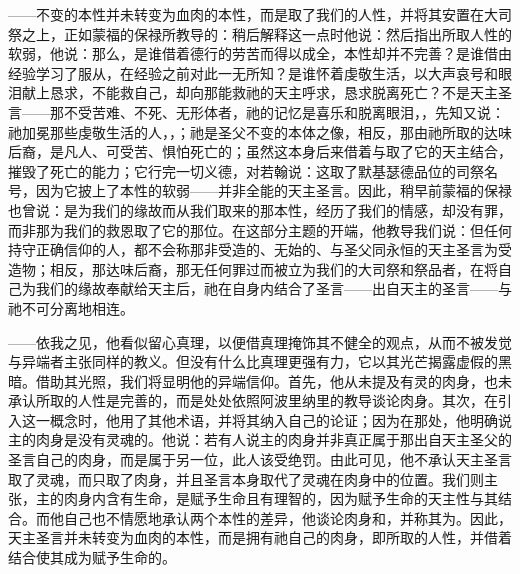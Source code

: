 ——不变的本性并未转变为血肉的本性，而是取了我们的人性，并将其安置在大司祭之上，正如蒙福的保禄所教导的：稍后解释这一点时他说：然后指出所取人性的软弱，他说：那么，是谁借着德行的劳苦而得以成全，本性却并不完善？是谁借由经验学习了服从，在经验之前对此一无所知？是谁怀着虔敬生活，以大声哀号和眼泪献上恳求，不能救自己，却向那能救祂的天主呼求，恳求脱离死亡？不是天主圣言——那不受苦难、不死、无形体者，祂的记忆是喜乐和脱离眼泪，，先知又说：祂加冕那些虔敬生活的人，，；祂是圣父不变的本体之像，相反，那由祂所取的达味后裔，是凡人、可受苦、惧怕死亡的；虽然这本身后来借着与取了它的天主结合，摧毁了死亡的能力；它行完一切义德，对若翰说：这取了默基瑟德品位的司祭名号，因为它披上了本性的软弱——并非全能的天主圣言。因此，稍早前蒙福的保禄也曾说：是为我们的缘故而从我们取来的那本性，经历了我们的情感，却没有罪，而非那为我们的救恩取了它的那位。在这部分主题的开端，他教导我们说：但任何持守正确信仰的人，都不会称那非受造的、无始的、与圣父同永恒的天主圣言为受造物；相反，那达味后裔，那无任何罪过而被立为我们的大司祭和祭品者，在将自己为我们的缘故奉献给天主后，祂在自身内结合了圣言——出自天主的圣言——与祂不可分离地相连。\par

——依我之见，他看似留心真理，以便借真理掩饰其不健全的观点，从而不被发觉与异端者主张同样的教义。但没有什么比真理更强有力，它以其光芒揭露虚假的黑暗。借助其光照，我们将显明他的异端信仰。首先，他从未提及有灵的肉身，也未承认所取的人性是完善的，而是处处依照阿波里纳里的教导谈论肉身。其次，在引入这一概念时，他用了其他术语，并将其纳入自己的论证；因为在那处，他明确说主的肉身是没有灵魂的。他说：若有人说主的肉身并非真正属于那出自天主圣父的圣言自己的肉身，而是属于另一位，此人该受绝罚。由此可见，他不承认天主圣言取了灵魂，而只取了肉身，并且圣言本身取代了灵魂在肉身中的位置。我们则主张，主的肉身内含有生命，是赋予生命且有理智的，因为赋予生命的天主性与其结合。而他自己也不情愿地承认两个本性的差异，他谈论肉身和，并称其为。因此，天主圣言并未转变为血肉的本性，而是拥有祂自己的肉身，即所取的人性，并借着结合使其成为赋予生命的。\par


